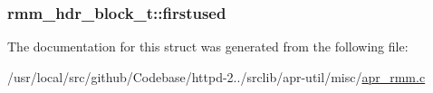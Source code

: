 \subsubsection[{\texorpdfstring{firstused}{firstused}}]{ rmm\+\_\+hdr\+\_\+block\+\_\+t\+::firstused}\hypertarget{structrmm__hdr__block__t_ab8743c7d906b6f3b8592c46a22a843c2}{}\label{structrmm__hdr__block__t_ab8743c7d906b6f3b8592c46a22a843c2}


The documentation for this struct was generated from the following file\+:\begin{DoxyCompactItemize}
\item 
/usr/local/src/github/\+Codebase/httpd-\/2../srclib/apr-\/util/misc/\hyperlink{apr__rmm_8c}{apr\+\_\+rmm.\+c}\end{DoxyCompactItemize}

